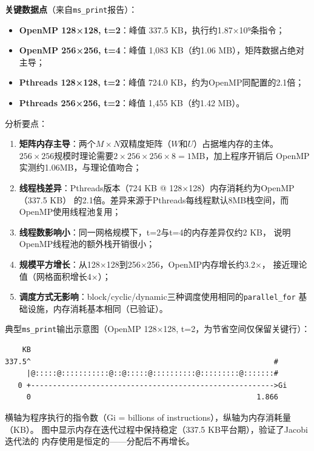 \documentclass[UTF8,a4paper,12pt,fontset=none]{ctexart}
\begin{document}
\textbf{关键数据点}（来自\texttt{ms\_print}报告）：
\begin{itemize}[leftmargin=2.2em]
  \item \textbf{OpenMP 128×128, t=2}：峰值 337.5 KB，执行约1.87×10⁹条指令；
  \item \textbf{OpenMP 256×256, t=4}：峰值 1,083 KB（约1.06 MB），矩阵数据占绝对主导；
  \item \textbf{Pthreads 128×128, t=2}：峰值 724.0 KB，约为OpenMP同配置的2.1倍；
  \item \textbf{Pthreads 256×256, t=2}：峰值 1,455 KB（约1.42 MB）。
\end{itemize}

分析要点：
\begin{enumerate}[leftmargin=2.2em]
  \item \textbf{矩阵内存主导}：两个$M\times N$双精度矩阵（$W$和$U$）占据堆内存的主体。
    $256\times256$规模时理论需要$2\times256\times256\times8=1$MB，加上程序开销后
    OpenMP实测约1.06MB，与理论值吻合；
  \item \textbf{线程栈差异}：Pthreads版本（724 KB @ 128×128）内存消耗约为OpenMP（337.5 KB）
    的2.1倍。差异来源于Pthreads每线程默认8MB栈空间，而OpenMP使用线程池复用；
  \item \textbf{线程数影响小}：同一网格规模下，t=2与t=4的内存差异仅约2 KB，
    说明OpenMP线程池的额外栈开销很小；
  \item \textbf{规模平方增长}：从128×128到256×256，OpenMP内存增长约3.2×，
    接近理论值（网格面积增长4×）；
  \item \textbf{调度方式无影响}：block/cyclic/dynamic三种调度使用相同的\texttt{parallel\_for}
    基础设施，内存消耗基本相同（已验证）。
\end{enumerate}

典型\texttt{ms\_print}输出示意图（OpenMP 128×128, t=2，为节省空间仅保留关键行）：

{\footnotesize
\begin{verbatim}
    KB
337.5^                                                        #
     |@:::::@:::::::::::@::@:::::@::::::::::@:::::::::@:::::::#
   0 +-------------------------------------------------------->Gi
     0                                                    1.866
\end{verbatim}
}

横轴为程序执行的指令数（Gi = billions of instructions），纵轴为内存消耗量（KB）。
图中显示内存在迭代过程中保持稳定（337.5 KB平台期），验证了Jacobi迭代法的
内存使用是恒定的——分配后不再增长。
\end{document}
